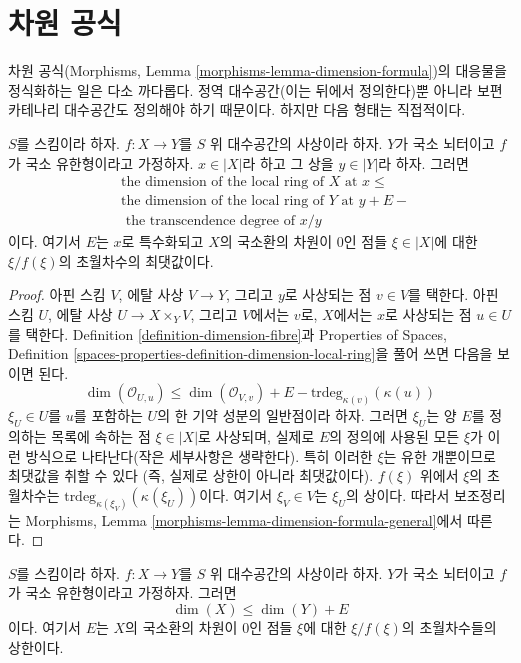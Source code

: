 \section{차원 공식}
\label{section-dimension-formula}

\noindent
차원 공식(Morphisms, Lemma
\ref{morphisms-lemma-dimension-formula})의 대응물을 정식화하는 일은
다소 까다롭다. 정역 대수공간(이는 뒤에서 정의한다)뿐 아니라 보편
카테나리 대수공간도 정의해야 하기 때문이다. 하지만 다음 형태는
직접적이다.

\begin{lemma}
\label{lemma-dimension-formula-general}
$S$를 스킴이라 하자. $f : X \to Y$를 $S$ 위 대수공간의
사상이라 하자. $Y$가 국소 뇌터이고 $f$가 국소 유한형이라고
가정하자. $x \in |X|$라 하고 그 상을 $y \in |Y|$라 하자.
그러면
\begin{align*}
& \text{the dimension of the local ring of }X\text{ at }x \leq \\
& \text{the dimension of the local ring of }Y\text{ at }y + E - \\
& \text{ the transcendence degree of }x/y
\end{align*}
이다. 여기서 $E$는 $x$로 특수화되고 $X$의 국소환의 차원이
$0$인 점들 $\xi \in |X|$에 대한 $\xi/f(\xi)$의 초월차수의 최댓값이다.
\end{lemma}

\begin{proof}
아핀 스킴 $V$, 에탈 사상 $V \to Y$, 그리고 $y$로 사상되는 점
$v \in V$를 택한다. 아핀 스킴 $U$, 에탈 사상
$U \to X \times_Y V$, 그리고 $V$에서는 $v$로, $X$에서는 $x$로
사상되는 점 $u \in U$를 택한다. Definition
\ref{definition-dimension-fibre}과 Properties of Spaces, Definition
\ref{spaces-properties-definition-dimension-local-ring}을 풀어 쓰면
다음을 보이면 된다.
$$
\dim(\mathcal{O}_{U, u}) \leq
\dim(\mathcal{O}_{V, v}) + E - \text{trdeg}_{\kappa(v)}(\kappa(u))
$$
$\xi_U \in U$를 $u$를 포함하는 $U$의 한 기약 성분의 일반점이라
하자. 그러면 $\xi_U$는 양 $E$를 정의하는 목록에 속하는 점
$\xi \in |X|$로 사상되며, 실제로 $E$의 정의에 사용된 모든
$\xi$가 이런 방식으로 나타난다(작은 세부사항은 생략한다).
특히 이러한 $\xi$는 유한 개뿐이므로 최댓값을 취할 수 있다
(즉, 실제로 상한이 아니라 최댓값이다).
$f(\xi)$ 위에서 $\xi$의 초월차수는
$\text{trdeg}_{\kappa(\xi_V)}(\kappa(\xi_U))$이다. 여기서
$\xi_V \in V$는 $\xi_U$의 상이다. 따라서 보조정리는 Morphisms,
Lemma \ref{morphisms-lemma-dimension-formula-general}에서 따른다.
\end{proof}

\begin{lemma}
\label{lemma-alteration-dimension-general}
$S$를 스킴이라 하자.
$f : X \to Y$를 $S$ 위 대수공간의 사상이라 하자. $Y$가 국소
뇌터이고 $f$가 국소 유한형이라고 가정하자. 그러면
$$
\dim(X) \leq \dim(Y) + E
$$
이다. 여기서 $E$는 $X$의 국소환의 차원이 $0$인 점들 $\xi$에 대한
$\xi/f(\xi)$의 초월차수들의 상한이다.
\end{lemma}

